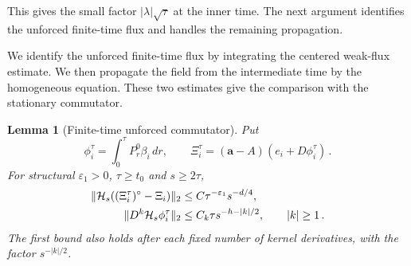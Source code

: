 \documentclass[11pt]{amsart}
\newtheorem{lemma}[proposition]{Lemma}
\theoremstyle{definition}
\theoremstyle{remark}
\numberwithin{equation}{section}
\renewcommand{\a}{\mathbf a}
\begin{document}
This gives the small factor $|\lambda|\sqrt\tau$ at the inner time. The next argument identifies the unforced finite-time flux and handles the remaining propagation.



We identify the unforced finite-time flux by integrating the centered weak-flux estimate. We then propagate the field from the intermediate time by the homogeneous equation. These two estimates give the comparison with the stationary commutator.

\begin{lemma}[Finite-time unforced commutator]\label{l:finite-xi}
Put
\begin{equation*}
 \phi_i^\tau=\int_0^\tau P_r^0\beta_i\,dr,\qquad
 \Xi_i^\tau=(\a-A)(e_i+D\phi_i^\tau)\, .
\end{equation*}
For structural $\varepsilon_1>0$, $\tau\geq t_0$ and $s\geq2\tau$,
\begin{align}\label{e:finite-xi}
 \|\mathcal H_s((\Xi_i^\tau)^\circ-\Xi_i)\|_2
    &\leq C\tau^{-\varepsilon_1}s^{-d/4},\notag\\
 \|D^k\mathcal H_s\phi_i^\tau\|_2
    &\leq C_k\tau s^{-h-|k|/2},\qquad |k|\geq1\, .
\end{align}
The first bound also holds after each fixed number of kernel derivatives, with the factor $s^{-|k|/2}$.
\end{lemma}
\end{document}
